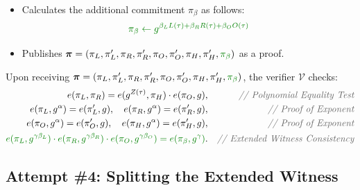 \documentclass[../lecture-notes.tex]{subfiles}
\begin{document}
\begin{tcolorbox}
\begin{itemize}[label=]
\begin{align*}
            \pi_L \gets g^{L(\tau)}, \quad \pi_L' \gets g^{\alpha L(\tau)}, \\
            \pi_R \gets g^{R(\tau)}, \quad \pi_R' \gets g^{\alpha R(\tau)}, \\
            \pi_O \gets g^{O(\tau)}, \quad \pi_O' \gets g^{\alpha O(\tau)}, \\
            \pi_H \gets g^{H(\tau)}, \quad \pi_H' \gets g^{\alpha H(\tau)}.
        \end{align*}
        \item \textcolor{green!50!black}{Calculates the additional commitment $\pi_{\beta}$ as follows:}
        \begin{equation*}
            \textcolor{green!50!black}{\pi_{\beta} \gets g^{\beta_LL(\tau) + \beta_RR(\tau) + \beta_OO(\tau)}}
        \end{equation*}
        \item Publishes $\boldsymbol{\pi} = (\pi_L,\pi_L',\pi_R,\pi_R',\pi_O,\pi_O',\pi_H,\pi_H',\textcolor{green!50!black}{\pi_{\beta}})$ as a proof.
    \end{itemize}

    Upon receiving $\boldsymbol{\pi} = (\pi_L,\pi_L',\pi_R,\pi_R',\pi_O,\pi_O',\pi_H,\pi_H',\textcolor{green!50!black}{\pi_{\beta}})$, the verifier $\mathcal{V}$ checks:
    \begin{align*}
        e(\pi_L, \pi_R) = e(g^{Z(\tau)}, \pi_H) \cdot e(\pi_O, g),&&\textcolor{gray!80!black}{\textit{// Polynomial Equality Test}} \\
        e(\pi_L, g^{\alpha}) = e(\pi_L', g), \quad e(\pi_R, g^{\alpha}) = e(\pi_R', g),&&\textcolor{gray!80!black}{\textit{// Proof of Exponent}} \\
        e(\pi_O, g^{\alpha}) = e(\pi_O', g), \quad e(\pi_H, g^{\alpha}) = e(\pi_H', g),&&\textcolor{gray!80!black}{\textit{// Proof of Exponent}} \\
        \textcolor{green!50!black}{e(\pi_L, g^{\gamma\beta_L}) \cdot e(\pi_R, g^{\gamma\beta_R}) \cdot e(\pi_O, g^{\gamma\beta_O}) = e(\pi_{\beta}, g^{\gamma})}.&&\textcolor{gray!80!black}{\textit{// Extended Witness Consistency}}
    \end{align*}
\end{tcolorbox}

\subsection{Attempt \#4: Splitting the Extended Witness}
\end{document}
